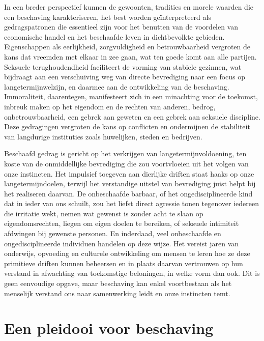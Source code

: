 In een breder perspectief kunnen de gewoonten, tradities en morele waarden die een beschaving karakteriseren, het best worden geïnterpreteerd als gedragspatronen die essentieel zijn voor het benutten van de voordelen van economische handel en het beschaafde leven in dichtbevolkte gebieden. Eigenschappen als eerlijkheid, zorgvuldigheid en betrouwbaarheid vergroten de kans dat vreemden met elkaar in zee gaan, wat ten goede komt aan alle partijen. Seksuele terughoudendheid faciliteert de vorming van stabiele gezinnen, wat bijdraagt aan een verschuiving weg van directe bevrediging naar een focus op langetermijnwelzijn, en daarmee aan de ontwikkeling van de beschaving.\autocite{216} Immoraliteit, daarentegen, manifesteert zich in een minachting voor de toekomst, inbreuk maken op het eigendom en de rechten van anderen, bedrog, onbetrouwbaarheid, een gebrek aan geweten en een gebrek aan seksuele discipline. Deze gedragingen vergroten de kans op conflicten en ondermijnen de stabiliteit van langdurige instituties zoals huwelijken, steden en bedrijven.

Beschaafd gedrag is gericht op het verkrijgen van langetermijnvoldoening, ten koste van de onmiddellijke bevrediging die zou voortvloeien uit het volgen van onze instincten. Het impulsief toegeven aan dierlijke driften staat haaks op onze langetermijndoelen, terwijl het verstandige uitstel van bevrediging juist helpt bij het realiseren daarvan. De onbeschaafde barbaar, of het ongedisciplineerde kind dat in ieder van ons schuilt, zou het liefst direct agressie tonen tegenover iedereen die irritatie wekt, nemen wat gewenst is zonder acht te slaan op eigendomsrechten, liegen om eigen doelen te bereiken, of seksuele intimiteit afdwingen bij gewenste personen. En inderdaad, veel onbeschaafde en ongedisciplineerde individuen handelen op deze wijze. Het vereist jaren van onderwijs, opvoeding en culturele ontwikkeling om mensen te leren hoe ze deze primitieve driften kunnen beheersen en in plaats daarvan vertrouwen op hun verstand in afwachting van toekomstige beloningen, in welke vorm dan ook. Dit is geen eenvoudige opgave, maar beschaving kan enkel voortbestaan als het menselijk verstand ons naar samenwerking leidt en onze instincten temt.

\hypertarget{het-pleidooi-voor-beschaving}{%
\section{Een pleidooi voor beschaving}\label{het-pleidooi-voor-beschaving}}

